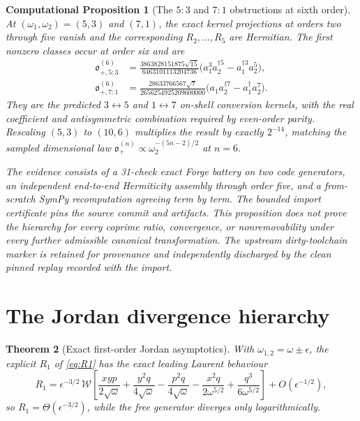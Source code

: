 \documentclass[11pt]{article}
\newtheorem{theorem}{Theorem}[section]
\newtheorem{cproposition}[theorem]{Computational Proposition}
\theoremstyle{definition}
\theoremstyle{remark}
\newcommand{\w}{\omega}
\newcommand{\dg}{\dagger}
\newcommand{\ob}{\mathfrak o}
\begin{document}
\begin{cproposition}[The $5{:}3$ and $7{:}1$ obstructions at sixth order]
\label{cprop:ordersix}
At $(\w_1,\w_2)=(5,3)$ and $(7,1)$, the exact kernel projections at
orders two through five vanish and the corresponding $R_2,\ldots,R_5$ are
Hermitian.  The first nonzero classes occur at order six and are
\begin{align}
\ob_{+,5:3}^{(6)}
&=\frac{3863828151875\sqrt{15}}{6463101113204736}
\big(a_1^3a_2^{\dg5}-a_1^{\dg3}a_2^5\big),\\
\ob_{+,7:1}^{(6)}
&=\frac{28633766567\sqrt7}{2656254925209600000}
\big(a_1a_2^{\dg7}-a_1^{\dg}a_2^7\big).
\end{align}
They are the predicted $3\leftrightarrow5$ and $1\leftrightarrow7$
on-shell conversion kernels, with the real coefficient and antisymmetric
combination required by even-order parity.  Rescaling $(5,3)$ to $(10,6)$
multiplies the result by exactly $2^{-14}$, matching the sampled dimensional
law $\ob_+^{(n)}\propto\w_2^{-(5n-2)/2}$ at $n=6$.

The evidence consists of a 31-check exact Forge battery on two code
generators, an independent end-to-end Hermiticity assembly through order five,
and a from-scratch SymPy recomputation agreeing term by term.  The bounded
import certificate pins the source commit and artifacts.  This proposition
does not prove the hierarchy for every coprime ratio, convergence, or
nonremovability under every further admissible canonical transformation.  The
upstream dirty-toolchain marker is retained for provenance and independently
discharged by the clean pinned replay recorded with the import.
\end{cproposition}

\section{The Jordan divergence hierarchy}\label{sec:jordanscaling}

\begin{theorem}[Exact first-order Jordan asymptotics]
\label{thm:jordanexact}
With $\w_{1,2}=\w\pm\epsilon$, the explicit $R_1$ of \eqref{eq:R1} has
the exact leading Laurent behaviour
\begin{equation}
R_1=\epsilon^{-3/2}\,\mathcal W\!\left[
\frac{xyp}{2\sqrt\w}+\frac{y^2q}{4\sqrt\w}-\frac{p^2q}{4\sqrt\w}
-\frac{x^2q}{2\w^{5/2}}+\frac{q^3}{6\w^{5/2}}
\right]+O(\epsilon^{-1/2}),
\end{equation}
so $R_1=\Theta(\epsilon^{-3/2})$, while the free generator diverges
only logarithmically.
\end{theorem}
\end{document}
